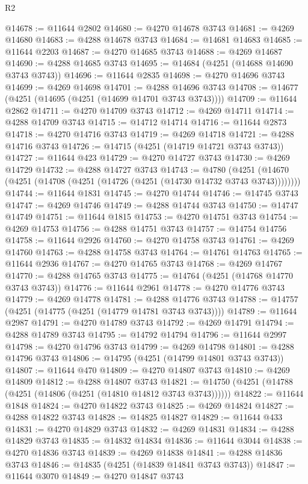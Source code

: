\begin{lexlean}{R2}
\begin{coremodule}
@14678 := @11644 @2802
@14680 := @4270 @14678 @3743
@14681 := @4269 @14680
@14683 := @4288 @14678 @3743
@14684 := @14681 @14683
@14685 := @11644 @2203
@14687 := @4270 @14685 @3743
@14688 := @4269 @14687
@14690 := @4288 @14685 @3743
@14695 := @14684 (@4251 (@14688 @14690 @3743 @3743))
@14696 := @11644 @2835
@14698 := @4270 @14696 @3743
@14699 := @4269 @14698
@14701 := @4288 @14696 @3743
@14708 := @14677 (@4251 (@14695 (@4251 (@14699 @14701 @3743 @3743))))
@14709 := @11644 @2862
@14711 := @4270 @14709 @3743
@14712 := @4269 @14711
@14714 := @4288 @14709 @3743
@14715 := @14712 @14714
@14716 := @11644 @2873
@14718 := @4270 @14716 @3743
@14719 := @4269 @14718
@14721 := @4288 @14716 @3743
@14726 := @14715 (@4251 (@14719 @14721 @3743 @3743))
@14727 := @11644 @423
@14729 := @4270 @14727 @3743
@14730 := @4269 @14729
@14732 := @4288 @14727 @3743
@14743 := @4780
    (@4251 (@14670 (@4251 (@14708 (@4251 (@14726 (@4251 (@14730 @14732 @3743 @3743))))))))
@14744 := @11644 @1831
@14745 := @4270 @14744
@14746 := @14745 @3743
@14747 := @4269 @14746
@14749 := @4288 @14744 @3743
@14750 := @14747 @14749
@14751 := @11644 @1815
@14753 := @4270 @14751 @3743
@14754 := @4269 @14753
@14756 := @4288 @14751 @3743
@14757 := @14754 @14756
@14758 := @11644 @2926
@14760 := @4270 @14758 @3743
@14761 := @4269 @14760
@14763 := @4288 @14758 @3743
@14764 := @14761 @14763
@14765 := @11644 @2936
@14767 := @4270 @14765 @3743
@14768 := @4269 @14767
@14770 := @4288 @14765 @3743
@14775 := @14764 (@4251 (@14768 @14770 @3743 @3743))
@14776 := @11644 @2961
@14778 := @4270 @14776 @3743
@14779 := @4269 @14778
@14781 := @4288 @14776 @3743
@14788 := @14757 (@4251 (@14775 (@4251 (@14779 @14781 @3743 @3743))))
@14789 := @11644 @2987
@14791 := @4270 @14789 @3743
@14792 := @4269 @14791
@14794 := @4288 @14789 @3743
@14795 := @14792 @14794
@14796 := @11644 @2997
@14798 := @4270 @14796 @3743
@14799 := @4269 @14798
@14801 := @4288 @14796 @3743
@14806 := @14795 (@4251 (@14799 @14801 @3743 @3743))
@14807 := @11644 @470
@14809 := @4270 @14807 @3743
@14810 := @4269 @14809
@14812 := @4288 @14807 @3743
@14821 := @14750 (@4251 (@14788 (@4251 (@14806 (@4251 (@14810 @14812 @3743 @3743))))))
@14822 := @11644 @1848
@14824 := @4270 @14822 @3743
@14825 := @4269 @14824
@14827 := @4288 @14822 @3743
@14828 := @14825 @14827
@14829 := @11644 @433
@14831 := @4270 @14829 @3743
@14832 := @4269 @14831
@14834 := @4288 @14829 @3743
@14835 := @14832 @14834
@14836 := @11644 @3044
@14838 := @4270 @14836 @3743
@14839 := @4269 @14838
@14841 := @4288 @14836 @3743
@14846 := @14835 (@4251 (@14839 @14841 @3743 @3743))
@14847 := @11644 @3070
@14849 := @4270 @14847 @3743

\end{coremodule}
\end{lexlean}
